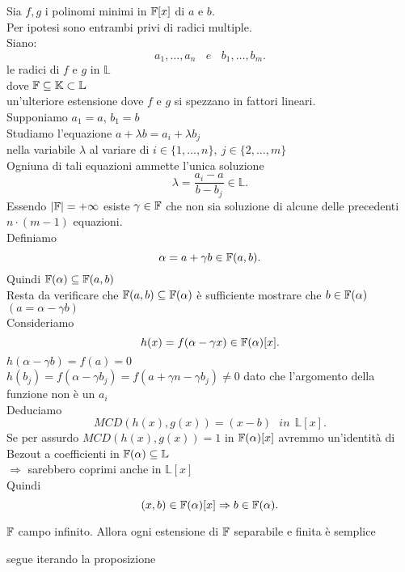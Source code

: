 \documentclass[12px]{article}
\begin{document}
\begin{dimo}
	Sia $f,g$ i polinomi minimi in  $\mathbb{F}[x]$ di  $a$ e $b$.\\
	Per ipotesi sono entrambi privi di radici multiple.\\
	Siano:
	 \[
	a_1,\ldots, a_n\ \ \ \ e \ \ \ \ b_1,\ldots, b_m
	.\] 
	le radici di $f$ e  $g$ in $\mathbb L$\\
	 dove $\mathbb{F}\subseteq\mathbb{K}\subset \mathbb L$\\
	 un'ulteriore estensione dove  $f$ e $g$ si spezzano in fattori lineari.\\
	 Supponiamo $a_1=a$, $b_1 = b$\\
	 Studiamo l'equazione $a + \lambda b = a_i + \lambda b_j$\\
	 nella variabile $ \lambda$ al variare di $i\in\{1,\ldots,n\}, \ j\in \{2,\ldots,m\}$\\
	 Ogniuna di tali equazioni ammette l'unica soluzione 
	  \[
		  \lambda = \frac{a_i-a}{b-b_j}\in\mathbb L
	 .\] 
	 Essendo $|\mathbb{F}| = +\infty$ esiste  $\gamma \in \mathbb{F}$ che non sia soluzione di alcune delle precedenti  $n\cdot(m-1)$ equazioni.\\
	 Definiamo
	  \[
	 \alpha = a  + \gamma b\in \mathbb{F}(a,b)
	 .\] 
	 Quindi $\mathbb{F}(\alpha)\subseteq\mathbb{F}(a,b)$\\
	 Resta da verificare che  $\mathbb{F}(a,b)\subseteq\mathbb{F}(\alpha)$ è sufficiente mostrare che  $b\in\mathbb{F}(\alpha)$ \\
	  $(a = \alpha - \gamma b)$\\
	  Consideriamo
	   \[
		   h(x) = f(\alpha - \gamma x)\in \mathbb{F}(\alpha)[x]
	  .\] 
	  $h(\alpha - \gamma b) = f(a) = 0$\\
	  $h(b_j) = f(\alpha - \gamma b_j) = f(a + \gamma n - \gamma b_j)\neq 0$ dato che l'argomento della funzione non è un  $a_i$\\
	  Deduciamo 
	   \[
	  MCD(h(x),g(x)) =(x - b) \ \ \ in \ \ \mathbb L[x]
	  .\] 
	  Se per assurdo $MCD(h(x), g(x)) = 1$ in  $\mathbb{F}(\alpha)[x]$ avremmo un'identità di Bezout a coefficienti in $\mathbb{F}(\alpha)\subseteq\mathbb {\mathbb{L}}$ \\
	  $ \Rightarrow  $ sarebbero coprimi anche in $\mathbb L [x]$\\
	  Quindi 
	  \[
		  (x,b)\in\mathbb{F}(\alpha)[x] \Rightarrow  b\in\mathbb{F}(\alpha)
	  .\] 
\end{dimo}
\begin{coro}
	$\mathbb{F}$ campo infinito. Allora ogni estensione di $\mathbb{F}$ separabile e finita è semplice
\end{coro}
\begin{dimo}
	segue iterando la proposizione
\end{dimo}
\end{document}
